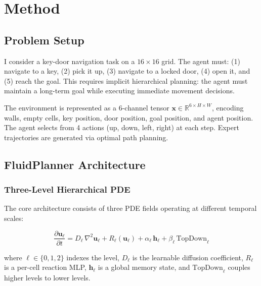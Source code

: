 \documentclass{article}
\newcommand{\R}{\mathbb{R}}
\begin{document}
\section{Method}
\label{sec:method}

\subsection{Problem Setup}

I consider a key-door navigation task on a $16 \times 16$ grid. The agent must: (1) navigate to a key, (2) pick it up, (3) navigate to a locked door, (4) open it, and (5) reach the goal. This requires implicit hierarchical planning: the agent must maintain a long-term goal while executing immediate movement decisions.

The environment is represented as a 6-channel tensor $\mathbf{x} \in \R^{6 \times H \times W}$, encoding walls, empty cells, key position, door position, goal position, and agent position. The agent selects from 4 actions (up, down, left, right) at each step. Expert trajectories are generated via optimal path planning.

\subsection{FluidPlanner Architecture}

\subsubsection{Three-Level Hierarchical PDE}

The core architecture consists of three PDE fields operating at different temporal scales:

\begin{equation}
\frac{\partial \mathbf{u}_\ell}{\partial t} = D_\ell \, \nabla^2 \mathbf{u}_\ell + R_\ell(\mathbf{u}_\ell) + \alpha_\ell \, \mathbf{h}_\ell + \beta_\ell \, \mathrm{TopDown}_\ell
\label{eq:pde_level}
\end{equation}

where $\ell \in \{0, 1, 2\}$ indexes the level, $D_\ell$ is the learnable diffusion coefficient, $R_\ell$ is a per-cell reaction MLP, $\mathbf{h}_\ell$ is a global memory state, and $\mathrm{TopDown}_\ell$ couples higher levels to lower levels.
\end{document}
